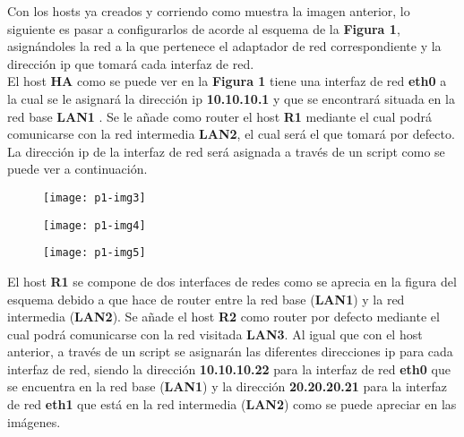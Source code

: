 \documentclass[10pt]{article}
\begin{document}
Con los hosts ya creados y corriendo como muestra la imagen anterior, lo siguiente es pasar a configurarlos de acorde al esquema de la
\textbf{Figura 1}, asignándoles la red a la que pertenece el adaptador de red correspondiente y la dirección ip que tomará cada interfaz de red. \\

El host \textbf{HA} como se puede ver en la \textbf{Figura 1} tiene una interfaz de red \textbf{eth0} a la cual se le asignará la dirección ip \textbf{10.10.10.1} y que se encontrará situada en la red base \textbf{LAN1} . Se le añade como router el host \textbf{R1} mediante el cual podrá comunicarse con la red intermedia \textbf{LAN2}, el cual será el que tomará por defecto. La dirección ip de la interfaz de red será asignada a través de un script como se puede ver a continuación. \\

\begin{figure}[H]
	\begin{center}
 		\texttt{[image: p1-img3]}
	\end{center} 
\end{figure}

\begin{figure}[H]
	\begin{center}
 		\texttt{[image: p1-img4]}
	\end{center} 
\end{figure}

\begin{figure}[H]
	\begin{center}
 		\texttt{[image: p1-img5]}
	\end{center} 
\end{figure}

El host \textbf{R1} se compone de dos interfaces de redes como se aprecia en la figura del esquema debido a que hace de router entre la red base (\textbf{LAN1}) y la red intermedia (\textbf{LAN2}). Se añade el host \textbf{R2} como router por defecto mediante el cual podrá comunicarse con la red visitada \textbf{LAN3}. Al igual que con el host anterior, a través de un script se asignarán las diferentes direcciones ip para cada interfaz de red, siendo la dirección \textbf{10.10.10.22} para la interfaz de red \textbf{eth0} que se encuentra en la red base (\textbf{LAN1}) y la dirección \textbf{20.20.20.21} para la interfaz de red \textbf{eth1} que está en la red intermedia (\textbf{LAN2}) como se puede apreciar en las imágenes. \\
\end{document}
